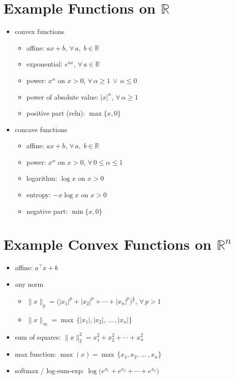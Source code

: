\documentclass[11pt]{extarticle}
\newcommand{\ds}{\displaystyle}
\theoremstyle{definition}
\begin{document}
\newpage

\section*{Example Functions on $\mathbb{R}$}

\begin{itemize}
  \item convex functions
    \begin{itemize}
      \item affine: $\ds ax + b$, $\forall\,a,\;b\in\mathbb{R}$
      \item exponential: $\ds e^{a x}$, $\forall\,a\in\mathbb{R}$
      \item power: $\ds x^\alpha$ on $x > 0$, $\forall\,\alpha\geqslant 1\,\vee\,\alpha\leqslant 0$
      \item power of absolute value: $\ds |x|^\alpha$, $\forall\,\alpha\geqslant 1$
      \item positive part (relu): $\max\{x, 0\}$
    \end{itemize}
  \item concave functions
    \begin{itemize}
      \item affine: $\ds ax + b$, $\forall\,a,\;b\in\mathbb{R}$
      \item power: $\ds x^\alpha$ on $x > 0$, $\forall\,0\leqslant\alpha\leqslant 1$
      \item logarithm: $\ds\log x$ on $x > 0$
      \item entropy: $\ds -x\log x$ on $x > 0$ 
      \item negative part: $\min\{x, 0\}$
    \end{itemize}
\end{itemize}

\newpage

\section*{Example Convex Functions on $\mathbb{R}^n$}

\begin{itemize}
  \item affine: $\ds a^\top\!x + b$
  \item any norm 
    \begin{itemize}
      \item $\ds\|x\|_p = \big(|x_1|^p + |x_2|^p + \cdots + |x_n|^p\big)^{\frac{1}{p}}$, $\forall\,p > 1$
      \item $\ds\|x\|_\infty = \max\,\{|x_1|, |x_2|,\,\ldots\,,|x_n|\}$
    \end{itemize}
  \item sum of squares: $\ds\|x\|_2^2 = x_1^2 + x_2^2 + \cdots + x_n^2$
  \item max function: $\ds\max(x) = \max\,\{x_1, x_2,\,\ldots\,,x_n\}$
  \item softmax / log-sum-exp: $\ds\log\big(e^{x_1} + e^{x_2} + \cdots + e^{x_n}\big)$
\end{itemize}
\end{document}
